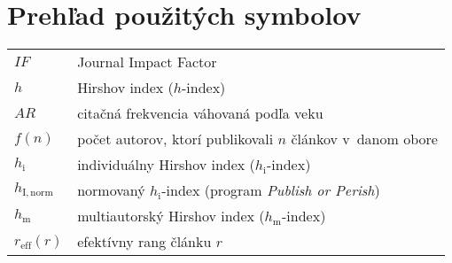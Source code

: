 \chapter*{Prehľad použitých symbolov}

\begin{flushleft}
\begin{longtable}[l]{ll} %
  $IF$              & Journal Impact Factor \\[1mm]
  $h$               & Hirshov index ($h$-index) \\[1mm]
  $AR$              & citačná frekvencia váhovaná podľa veku \\[1mm]  
  $f(n)$            & počet autorov, ktorí publikovali $n$ článkov v~danom obore \\[1mm]
  $h_{\mathrm{i}}$       & individuálny Hirshov index ($h_{\mathrm{i}}$-index)  \\[1mm]
  $h_{\mathrm{I, norm}}$  & normovaný $h_{\mathrm{i}}$-index (program {\em Publish or Perish})\\[1mm]
  $h_{\mathrm{m}}$       & multiautorský Hirshov index ($h_{\mathrm{m}}$-index) \\[1mm]
  $r_{\mathrm{eff}}(r)$  & efektívny rang článku $r$\\[1mm]

\end{longtable}
\end{flushleft}


